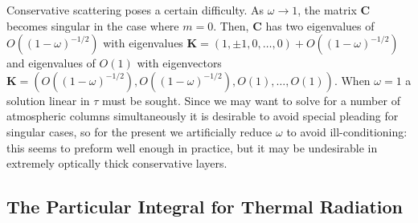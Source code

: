 Conservative scattering poses a certain difficulty. As $\omega \rightarrow 1$,
the matrix $\mathbf{C}$ becomes singular in the case where $m=0$. Then, 
$\mathbf{C}$ has two eigenvalues of $O((1-\omega)^{-1/2})$ with eigenvalues
$\mathbf{K}=(1,\pm 1, 0, \ldots, 0) + O((1-\omega)^{-1/2})$ and eigenvalues
of $O(1)$ with eigenvectors $\mathbf{K}= (O((1-\omega)^{-1/2}), 
O((1-\omega)^{-1/2}), O(1), \ldots, O(1))$. When $\omega=1$ a solution
linear in $\tau$ must be sought. Since we may want to solve for a number
of atmospheric columns simultaneously it is desirable to avoid special 
pleading for singular cases, so for the present we artificially reduce
$\omega$ to avoid ill-conditioning: this seems to preform well enough
in practice, but it may be undesirable in extremely optically thick
conservative layers.

\subsection{The Particular Integral for Thermal Radiation}

